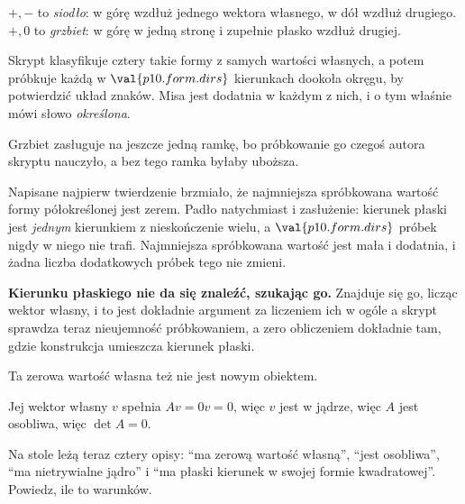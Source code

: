 \begin{fr}
\begin{ansblock}
$+,-$ to \emph{siodło}: w górę wzdłuż jednego wektora własnego, w dół wzdłuż
drugiego. $+,0$ to \emph{grzbiet}: w górę w jedną stronę i zupełnie płasko
wzdłuż drugiej.
\end{ansblock}

Skrypt klasyfikuje cztery takie formy z samych wartości własnych, a potem
próbkuje każdą w $\val{p10.form.dirs}$ kierunkach dookoła okręgu, by potwierdzić
układ znaków. Misa jest dodatnia w każdym z nich, i o tym właśnie mówi słowo
\emph{określona}.
\end{fr}

\begin{fr}
Grzbiet zasługuje na jeszcze jedną ramkę, bo próbkowanie go czegoś autora
skryptu nauczyło, a bez tego ramka byłaby uboższa.

Napisane najpierw twierdzenie brzmiało, że najmniejsza spróbkowana wartość
formy półokreślonej jest zerem. Padło natychmiast i zasłużenie: kierunek płaski
jest \emph{jednym} kierunkiem z nieskończenie wielu, a
$\val{p10.form.dirs}$ próbek nigdy w niego nie trafi. Najmniejsza spróbkowana
wartość jest mała i dodatnia, i żadna liczba dodatkowych próbek tego nie zmieni.

\textbf{Kierunku płaskiego nie da się znaleźć, szukając go.} Znajduje się go,
licząc wektor własny, i to jest dokładnie argument za liczeniem ich w ogóle
\dash{} a skrypt sprawdza teraz nieujemność próbkowaniem, a zero obliczeniem
dokładnie tam, gdzie konstrukcja umieszcza kierunek płaski.
\end{fr}


\begin{fr}
Ta zerowa wartość własna też nie jest nowym obiektem.

Jej wektor własny $v$ spełnia $Av = 0v = 0$, więc $v$ jest w jądrze, więc $A$
jest osobliwa, więc $\det A = 0$.

Na stole leżą teraz cztery opisy: \enquote{ma zerową wartość własną},
\enquote{jest osobliwa}, \enquote{ma nietrywialne jądro} i \enquote{ma płaski
kierunek w swojej formie kwadratowej}. Powiedz, ile to warunków.
\dotline
\nextframe
\end{fr}

